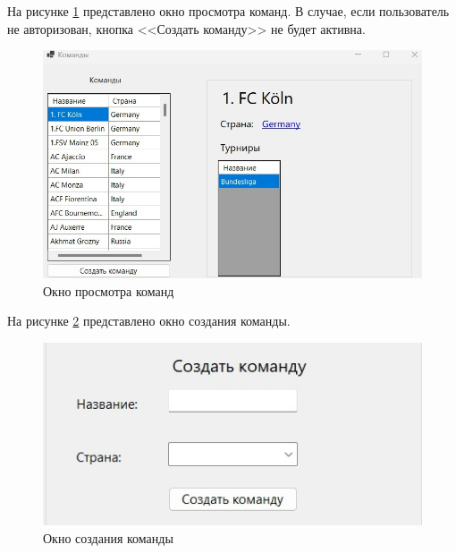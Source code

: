 На рисунке \ref{img:tea} представлено окно просмотра команд. В случае, если пользователь не авторизован, кнопка <<Создать команду>> не будет активна.
\begin{figure}
  \centering
  \includegraphics[scale=0.5]{inc/teams.jpg}
  \caption{Окно просмотра команд}
  \label{img:tea}
\end{figure}
На рисунке \ref{img:teac} представлено окно создания команды.
\begin{figure}
  \centering
  \includegraphics[scale=0.5]{inc/teamscr.jpg}
  \caption{Окно создания команды}
  \label{img:teac}
\end{figure}

